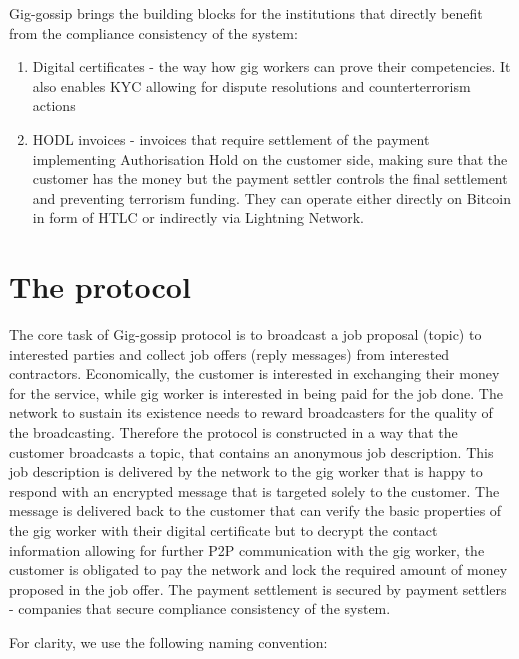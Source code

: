 \documentclass{article}
\begin{document}
Gig-gossip brings the building blocks for the institutions that directly benefit from the compliance consistency of the system:
\begin{enumerate}
	\item Digital certificates - the way how gig workers can prove their competencies. It also enables KYC allowing for dispute resolutions and counterterrorism actions 
	\item HODL invoices - invoices that require settlement of the payment implementing Authorisation Hold on the customer side, making sure that the customer has the money but the payment settler controls the final settlement and preventing terrorism funding. They can operate either directly on Bitcoin in form of HTLC or indirectly via Lightning Network.
\end{enumerate}
 
\section{The protocol}
The core task of Gig-gossip protocol is to broadcast a job proposal (topic) to interested parties and collect job offers (reply messages) from interested contractors. Economically, the customer is interested in exchanging their money for the service, while gig worker is interested in being paid for the job done. The network to sustain its existence needs to reward broadcasters for the quality of the broadcasting. Therefore the protocol is constructed in a way that the customer broadcasts a topic, that contains an anonymous job description. This job description is delivered by the network to the gig worker that is happy to respond with an encrypted message that is targeted solely to the customer. The message is delivered back to the customer that can verify the basic properties of the gig worker with their digital certificate but to decrypt the contact information allowing for further P2P communication with the gig worker, the customer is obligated to pay the network and lock the required amount of money proposed in the job offer. The payment settlement is secured by payment settlers - companies that secure compliance consistency of the system.

For clarity, we use the following naming convention:
\end{document}
